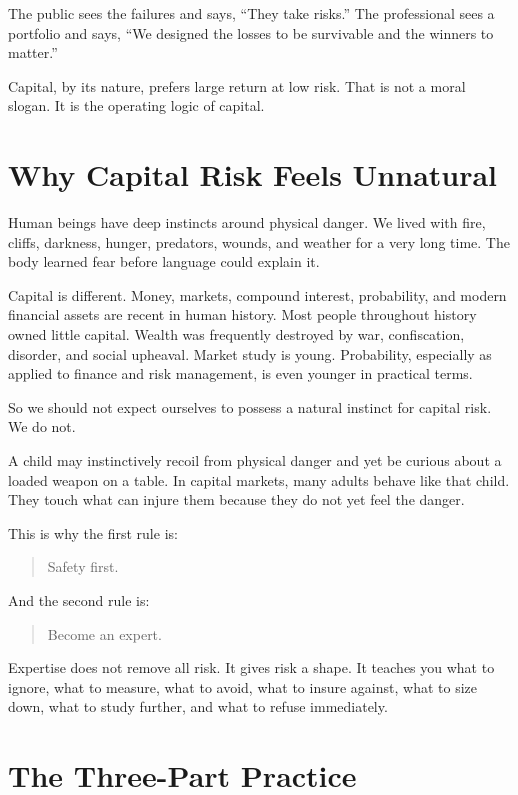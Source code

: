 The public sees the failures and says, ``They take risks.'' The professional sees a portfolio and says, ``We designed the losses to be survivable and the winners to matter.''

Capital, by its nature, prefers large return at low risk. That is not a moral slogan. It is the operating logic of capital.

\section*{Why Capital Risk Feels Unnatural}

Human beings have deep instincts around physical danger. We lived with fire, cliffs, darkness, hunger, predators, wounds, and weather for a very long time. The body learned fear before language could explain it.

Capital is different. Money, markets, compound interest, probability, and modern financial assets are recent in human history. Most people throughout history owned little capital. Wealth was frequently destroyed by war, confiscation, disorder, and social upheaval. Market study is young. Probability, especially as applied to finance and risk management, is even younger in practical terms.

So we should not expect ourselves to possess a natural instinct for capital risk. We do not.

A child may instinctively recoil from physical danger and yet be curious about a loaded weapon on a table. In capital markets, many adults behave like that child. They touch what can injure them because they do not yet feel the danger.

This is why the first rule is:

\begin{quote}
Safety first.
\end{quote}

And the second rule is:

\begin{quote}
Become an expert.
\end{quote}

Expertise does not remove all risk. It gives risk a shape. It teaches you what to ignore, what to measure, what to avoid, what to insure against, what to size down, what to study further, and what to refuse immediately.

\section*{The Three-Part Practice}

